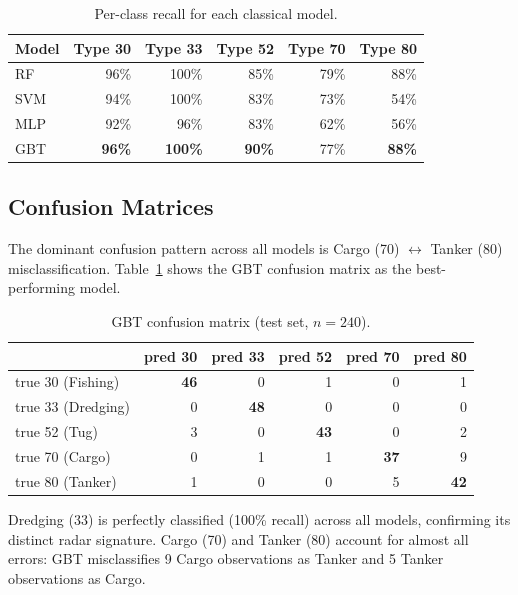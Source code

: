 \documentclass[journal]{IEEEtran}
\begin{document}
\begin{table}[H]
\centering
\caption{Per-class recall for each classical model.}
\begin{tabular}{lrrrrr}
\toprule
\textbf{Model} & \textbf{Type 30} & \textbf{Type 33} & \textbf{Type 52}
               & \textbf{Type 70} & \textbf{Type 80} \\
\midrule
RF  & 96\% & 100\% & 85\% & 79\% & 88\% \\
SVM & 94\% & 100\% & 83\% & 73\% & 54\% \\
MLP & 92\% &  96\% & 83\% & 62\% & 56\% \\
GBT & \textbf{96\%} & \textbf{100\%} & \textbf{90\%} & 77\% & \textbf{88\%} \\
\bottomrule
\end{tabular}
\end{table}

\subsection{Confusion Matrices}

The dominant confusion pattern across all models is Cargo (70) $\leftrightarrow$
Tanker (80) misclassification.
Table~\ref{tab:cm_gbt} shows the GBT confusion matrix as the best-performing model.

\begin{table}[H]
\centering
\caption{GBT confusion matrix (test set, $n=240$).}
\label{tab:cm_gbt}
\begin{tabular}{lrrrrr}
\toprule
 & \textbf{pred 30} & \textbf{pred 33} & \textbf{pred 52}
 & \textbf{pred 70} & \textbf{pred 80} \\
\midrule
true 30 (Fishing)  & \textbf{46} & 0 & 1 & 0 & 1 \\
true 33 (Dredging) & 0 & \textbf{48} & 0 & 0 & 0 \\
true 52 (Tug)      & 3 & 0 & \textbf{43} & 0 & 2 \\
true 70 (Cargo)    & 0 & 1 & 1 & \textbf{37} & 9 \\
true 80 (Tanker)   & 1 & 0 & 0 & 5 & \textbf{42} \\
\bottomrule
\end{tabular}
\end{table}

\noindent Dredging (33) is perfectly classified (100\% recall) across all models,
confirming its distinct radar signature.
Cargo (70) and Tanker (80) account for almost all errors: GBT misclassifies
9 Cargo observations as Tanker and 5 Tanker observations as Cargo.
\end{document}

